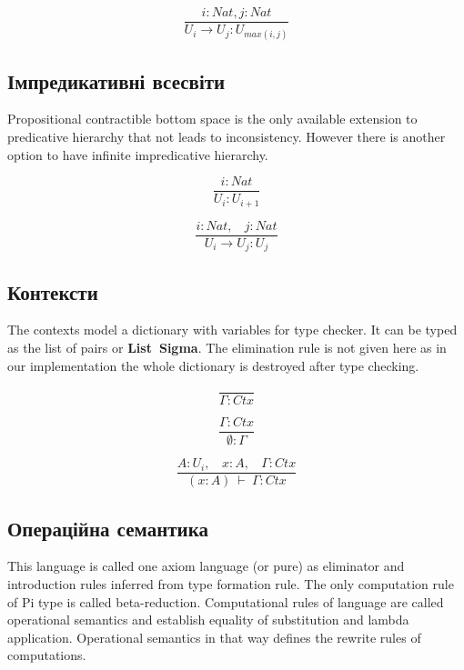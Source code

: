 \[
\tag{$R_1$}
\dfrac{i : Nat, j : Nat}{U_i \rightarrow U_j : U_{max(i,j)} }
\]

\subsection*{Імпредикативні всесвіти}
Propositional contractible bottom space is the only
available extension to predicative hierarchy that not leads to inconsistency.
However there is another option to have infinite
impredicative hierarchy.

\begin{equation}
\tag{$A_2$}
\dfrac
{i: Nat}
{U_i : U_{i+1}}
\end{equation}

\begin{equation}
\tag{$R_2$}
\dfrac
{i : Nat,\ \ \ \ j : Nat}
{U_i \rightarrow U_{j} : U_{j}}
\end{equation}

\subsection{Контексти}

The contexts model a dictionary with variables for type checker.
It can be typed as the list of pairs or {\bf List\ Sigma}.
The elimination rule is not given here as in our implementation the whole dictionary is destroyed after type checking.

\begin{equation}
\tag{Ctx-formation}
\dfrac
{}
{\Gamma : Ctx}
\end{equation}

\begin{equation}
\tag{Ctx-intro$_1$}
\dfrac
{\Gamma : Ctx}
{\emptyset : \Gamma}
\end{equation}

\begin{equation}
\tag{Ctx-intro$_2$}
\dfrac
{A : U_i,\ \ \ \ x : A,\ \ \ \ \Gamma : Ctx}
{(x : A)\ \vdash\ \Gamma : Ctx}
\end{equation}

\newpage
\subsection{Операційна семантика}

This language is called one axiom language (or pure) as eliminator
and introduction rules inferred from type formation rule.
The only computation rule of Pi type is called beta-reduction.
Computational rules of language are called operational semantics
and establish equality of substitution and lambda application.
Operational semantics in that way defines the rewrite rules of computations.

